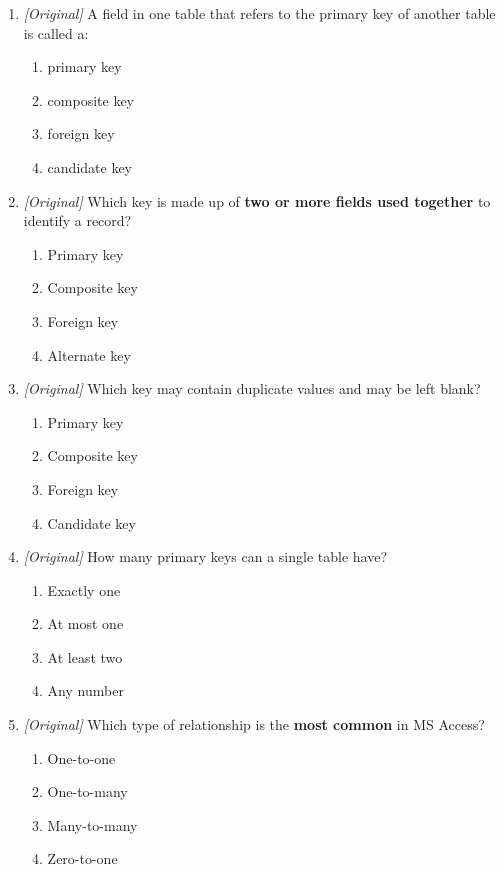 \documentclass[11pt]{article}
\begin{document}
\begin{enumerate}[label=\textbf{Q\arabic*.}, leftmargin=*]
\begin{enumerate}[label=\Alph*.]
  \end{enumerate}
\item \textit{[Original]} A field in one table that refers to the primary key
  of another table is called a:
  \begin{enumerate}[label=\Alph*.]
    \item primary key
    \item composite key
    \item foreign key
    \item candidate key
  \end{enumerate}
\item \textit{[Original]} Which key is made up of \textbf{two or more fields
  used together} to identify a record?
  \begin{enumerate}[label=\Alph*.]
    \item Primary key
    \item Composite key
    \item Foreign key
    \item Alternate key
  \end{enumerate}
\item \textit{[Original]} Which key may contain duplicate values and may be
  left blank?
  \begin{enumerate}[label=\Alph*.]
    \item Primary key
    \item Composite key
    \item Foreign key
    \item Candidate key
  \end{enumerate}
\item \textit{[Original]} How many primary keys can a single table have?
  \begin{enumerate}[label=\Alph*.]
    \item Exactly one
    \item At most one
    \item At least two
    \item Any number
  \end{enumerate}
\item \textit{[Original]} Which type of relationship is the \textbf{most
  common} in MS Access?
  \begin{enumerate}[label=\Alph*.]
    \item One-to-one
    \item One-to-many
    \item Many-to-many
    \item Zero-to-one

\end{enumerate}
\end{enumerate}
\end{document}
